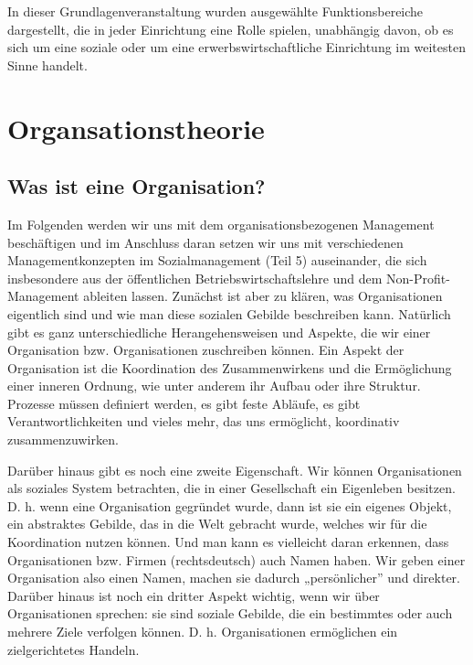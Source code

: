 \documentclass[
  letterpaper,
]{book}
\begin{document}
In dieser Grundlagenveranstaltung wurden ausgewählte Funktionsbereiche
dargestellt, die in jeder Einrichtung eine Rolle spielen, unabhängig
davon, ob es sich um eine soziale oder um eine erwerbswirtschaftliche
Einrichtung im weitesten Sinne handelt.

\chapter{Organsationstheorie}\label{organsationstheorie}

\section{Was ist eine Organisation?}\label{was-ist-eine-organisation}

Im Folgenden werden wir uns mit dem organisationsbezogenen Management
beschäftigen und im Anschluss daran setzen wir uns mit verschiedenen
Managementkonzepten im Sozialmanagement (Teil 5) auseinander, die sich
insbesondere aus der öffentlichen Betriebswirtschaftslehre und dem
Non-Profit-Management ableiten lassen. Zunächst ist aber zu klären, was
Organisationen eigentlich sind und wie man diese sozialen Gebilde
beschreiben kann. Natürlich gibt es ganz unterschiedliche
Herangehensweisen und Aspekte, die wir einer Organisation bzw.
Organisationen zuschreiben können. Ein Aspekt der Organisation ist die
Koordination des Zusammenwirkens und die Ermöglichung einer inneren
Ordnung, wie unter anderem ihr Aufbau oder ihre Struktur. Prozesse
müssen definiert werden, es gibt feste Abläufe, es gibt
Verantwortlichkeiten und vieles mehr, das uns ermöglicht, koordinativ
zusammenzuwirken.

Darüber hinaus gibt es noch eine zweite Eigenschaft. Wir können
Organisationen als soziales System betrachten, die in einer Gesellschaft
ein Eigenleben besitzen. D. h. wenn eine Organisation gegründet wurde,
dann ist sie ein eigenes Objekt, ein abstraktes Gebilde, das in die Welt
gebracht wurde, welches wir für die Koordination nutzen können. Und man
kann es vielleicht daran erkennen, dass Organisationen bzw. Firmen
(rechtsdeutsch) auch Namen haben. Wir geben einer Organisation also
einen Namen, machen sie dadurch „persönlicher'' und direkter. Darüber
hinaus ist noch ein dritter Aspekt wichtig, wenn wir über Organisationen
sprechen: sie sind soziale Gebilde, die ein bestimmtes oder auch mehrere
Ziele verfolgen können. D. h. Organisationen ermöglichen ein
zielgerichtetes Handeln.
\end{document}

